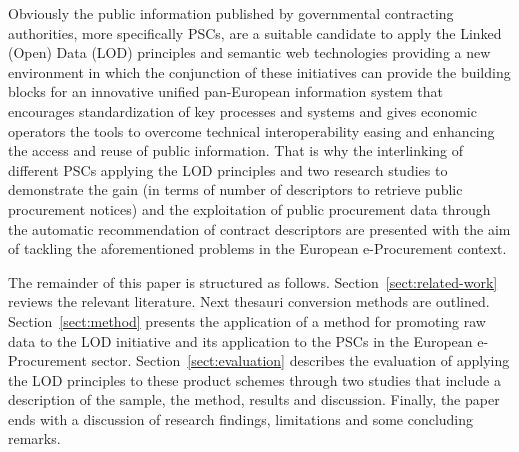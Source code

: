 Obviously the public information published by governmental contracting authorities, more specifically PSCs, are a suitable candidate to apply the Linked (Open) Data 
(LOD) principles and semantic web technologies providing a new environment in which the conjunction of these initiatives can provide the building blocks for an 
innovative unified pan-European information system that encourages standardization of key processes and systems and gives economic operators the tools to overcome 
technical interoperability easing and enhancing the access and reuse of public information. That is why the interlinking of different PSCs applying the LOD principles and two 
research studies to demonstrate the gain (in terms of number of descriptors to retrieve public procurement notices) and the exploitation of public procurement data 
through the automatic recommendation of contract descriptors are presented with the aim of tackling the aforementioned problems in the European e-Procurement context. 


The remainder of this paper is structured as follows. Section~\ref{sect:related-work} reviews the relevant literature. Next thesauri 
conversion methods are outlined. Section~\ref{sect:method} presents the application of a method for promoting raw data to the LOD initiative 
and its application to the PSCs in the European e-Procurement sector. Section~\ref{sect:evaluation} describes the evaluation of applying the LOD principles to 
these product schemes through two studies that include a description of the sample, the method, results and discussion. Finally, 
the paper ends with a discussion of research findings, limitations and some concluding remarks.
